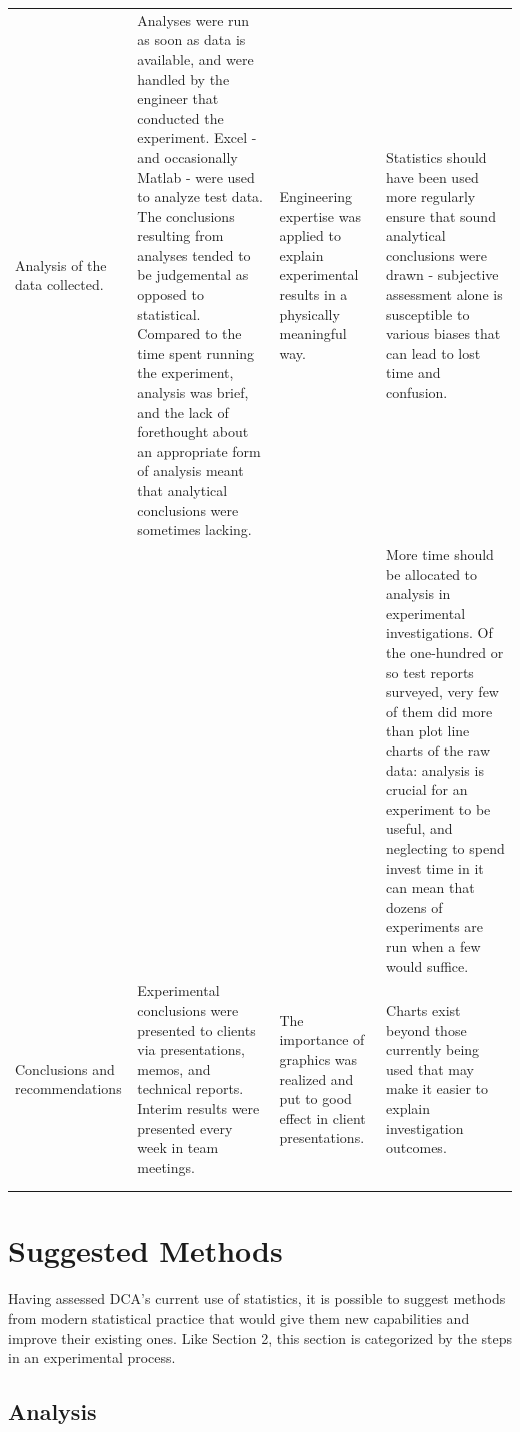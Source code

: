 \documentclass[11pt,a4paper,article]{memoir} %
\begin{document}
\begin{landscape}
{\begin{longtable}{p{4cm} p{7cm} p{6cm} p{6cm}}
Analysis of the data collected. & Analyses were run as soon as data is available, and were handled by the engineer that conducted the experiment. Excel - and occasionally Matlab - were used to analyze test data. The conclusions resulting from analyses tended to be judgemental as opposed to statistical. Compared to the time spent running the experiment, analysis was brief, and the lack of forethought about an appropriate form of analysis meant that analytical conclusions were sometimes lacking. & Engineering expertise was applied to explain experimental results in a physically meaningful way. & Statistics should have been used more regularly ensure that sound analytical conclusions were drawn - subjective assessment alone is susceptible to various biases that can lead to lost time and confusion.\\ 
 &  &  & More time should be allocated to analysis in experimental investigations. Of the one-hundred or so test reports surveyed, very few of them did more than plot line charts of the raw data: analysis is crucial for an experiment to be useful, and neglecting to spend invest time in it can mean that dozens of experiments are run when a few would suffice.\\ 
\cmidrule{1-4}
Conclusions and recommendations & Experimental conclusions were presented to clients via presentations, memos, and technical reports. Interim results were presented every week in team meetings. & The importance of graphics was realized and put to good effect in client presentations. & Charts exist beyond those currently being used that may make it easier to explain investigation outcomes. \\ 
 &  \\
\bottomrule
\label{tab:exp_procedure}
\end{longtable}
}
\end{landscape}


\newpage
\chapter{Suggested Methods}\label{suggested_methods}
\label{chap:modernstats}

Having assessed DCA's current use of statistics, it is possible to suggest methods from modern statistical practice that would give them new capabilities and improve their existing ones. Like Section 2, this section is categorized by the steps in an experimental process.


\newpage
\section{Analysis}
\end{document}
